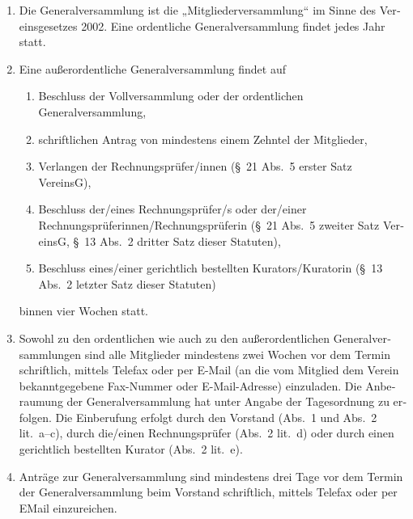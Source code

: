 \begin{otherlanguage}{german}

\begin{enumerate}[statutenenum]
    \item Die Generalversammlung ist die „Mitgliederversammlung“ im Sinne des Vereinsgesetzes 2002.
        Eine ordentliche Generalversammlung findet jedes Jahr statt.

    \item Eine außerordentliche Generalversammlung findet auf
        \begin{enumerate}[statutenenum]
            \item Beschluss der Vollversammlung oder der ordentlichen Generalversammlung,

            \item schriftlichen Antrag von mindestens einem Zehntel der Mitglieder,

            \item Verlangen der Rechnungsprüfer/innen (\S\ 21 Abs.\ 5 erster Satz VereinsG),

            \item Beschluss der/eines Rechnungsprüfer/s oder der/einer Rechnungsprüferinnen/Rechnungsprüferin (\S\ 21 Abs.\ 5 zweiter Satz VereinsG, \S\ 13 Abs.\ 2 dritter Satz dieser Statuten),

            \item Beschluss eines/einer gerichtlich bestellten Kurators/Kuratorin (\S\ 13 Abs.\ 2 letzter Satz dieser Statuten)
        \end{enumerate}
        binnen vier Wochen statt.

    \item Sowohl zu den ordentlichen wie auch zu den außerordentlichen Generalversammlungen sind alle Mitglieder mindestens zwei Wochen vor dem Termin schriftlich, mittels Telefax oder per E-Mail (an die vom Mitglied dem Verein bekanntgegebene Fax-Nummer oder E-Mail-Adresse) einzuladen.
        Die Anberaumung der Generalversammlung hat unter Angabe der Tagesordnung zu erfolgen.
        Die Einberufung erfolgt durch den Vorstand (Abs.\ 1 und Abs.\ 2 lit.\ a--c), durch die/einen Rechnungsprüfer (Abs.\ 2 lit.\ d) oder durch einen gerichtlich bestellten Kurator (Abs.\ 2 lit.\ e).

    \item Anträge zur Generalversammlung sind mindestens drei Tage vor dem Termin der Generalversammlung beim Vorstand schriftlich, mittels Telefax oder per EMail einzureichen.


\end{enumerate}
\end{otherlanguage}
